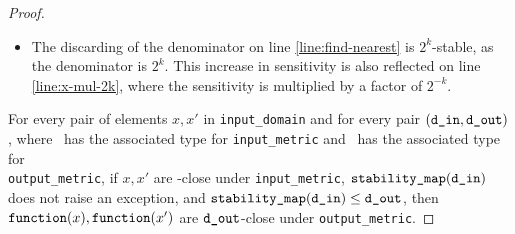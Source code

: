 \documentclass{article}
\begin{document}
\begin{proof}
\begin{itemize}
        \item The discarding of the denominator on line \ref{line:find-nearest} is $2^k$-stable,
            as the denominator is $2^k$.
            This increase in sensitivity is also reflected on line \ref{line:x-mul-2k},
            where the sensitivity is multiplied by a factor of $2^{-k}$.
    \end{itemize}

    For every pair of elements $x, x'$ in \texttt{input\_domain} and for every pair $(\texttt{d\_in}, \texttt{d\_out})$, 
    where \din\ has the associated type for \texttt{input\_metric} and \dout\ has the associated type for \\ \texttt{output\_metric}, 
    if $x, x'$ are \din-close under \texttt{input\_metric}, $\texttt{stability\_map}(\texttt{d\_in})$ does not raise an exception,
    and $\texttt{stability\_map}(\texttt{d\_in}) \leq \texttt{d\_out}$, 
    then $\texttt{function}(x), \texttt{function}(x')$ are $\texttt{d\_out}$-close under \texttt{output\_metric}.
\end{proof}
\end{document}
